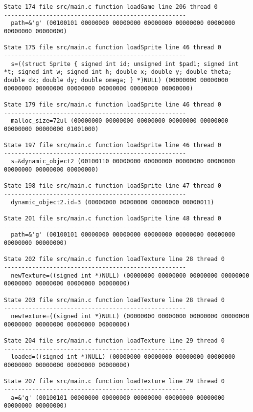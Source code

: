 \begin{verbatim}
State 174 file src/main.c function loadGame line 206 thread 0
----------------------------------------------------
  path=&'g' (00100101 00000000 00000000 00000000 00000000 00000000 00000000 00000000)

State 175 file src/main.c function loadSprite line 46 thread 0
----------------------------------------------------
  s=((struct Sprite { signed int id; unsigned int $pad1; signed int *t; signed int w; signed int h; double x; double y; double theta; double dx; double dy; double omega; } *)NULL) (00000000 00000000 00000000 00000000 00000000 00000000 00000000 00000000)

State 179 file src/main.c function loadSprite line 46 thread 0
----------------------------------------------------
  malloc_size=72ul (00000000 00000000 00000000 00000000 00000000 00000000 00000000 01001000)

State 197 file src/main.c function loadSprite line 46 thread 0
----------------------------------------------------
  s=&dynamic_object2 (00100110 00000000 00000000 00000000 00000000 00000000 00000000 00000000)

State 198 file src/main.c function loadSprite line 47 thread 0
----------------------------------------------------
  dynamic_object2.id=3 (00000000 00000000 00000000 00000011)

State 201 file src/main.c function loadSprite line 48 thread 0
----------------------------------------------------
  path=&'g' (00100101 00000000 00000000 00000000 00000000 00000000 00000000 00000000)

State 202 file src/main.c function loadTexture line 28 thread 0
----------------------------------------------------
  newTexture=((signed int *)NULL) (00000000 00000000 00000000 00000000 00000000 00000000 00000000 00000000)

State 203 file src/main.c function loadTexture line 28 thread 0
----------------------------------------------------
  newTexture=((signed int *)NULL) (00000000 00000000 00000000 00000000 00000000 00000000 00000000 00000000)

State 204 file src/main.c function loadTexture line 29 thread 0
----------------------------------------------------
  loaded=((signed int *)NULL) (00000000 00000000 00000000 00000000 00000000 00000000 00000000 00000000)

State 207 file src/main.c function loadTexture line 29 thread 0
----------------------------------------------------
  a=&'g' (00100101 00000000 00000000 00000000 00000000 00000000 00000000 00000000)


\end{verbatim}
